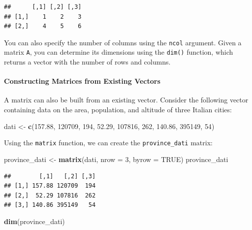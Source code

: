 \documentclass[
]{article}
\newenvironment{Shaded}{\begin{snugshade}}{\end{snugshade}}
\newcommand{\AttributeTok}[1]{\textcolor[rgb]{0.13,0.29,0.53}{#1}}
\newcommand{\ConstantTok}[1]{\textcolor[rgb]{0.56,0.35,0.01}{#1}}
\newcommand{\DecValTok}[1]{\textcolor[rgb]{0.00,0.00,0.81}{#1}}
\newcommand{\FloatTok}[1]{\textcolor[rgb]{0.00,0.00,0.81}{#1}}
\newcommand{\FunctionTok}[1]{\textcolor[rgb]{0.13,0.29,0.53}{\textbf{#1}}}
\newcommand{\NormalTok}[1]{#1}
\newcommand{\OtherTok}[1]{\textcolor[rgb]{0.56,0.35,0.01}{#1}}
\begin{document}
\begin{verbatim}
##      [,1] [,2] [,3]
## [1,]    1    2    3
## [2,]    4    5    6
\end{verbatim}

You can also specify the number of columns using the \texttt{ncol}
argument. Given a matrix \texttt{A}, you can determine its dimensions
using the \texttt{dim()} function, which returns a vector with the
number of rows and columns.

\hypertarget{constructing-matrices-from-existing-vectors}{%
\paragraph{Constructing Matrices from Existing
Vectors}\label{constructing-matrices-from-existing-vectors}}

A matrix can also be built from an existing vector. Consider the
following vector containing data on the area, population, and altitude
of three Italian cities:

\begin{Shaded}
\begin{Highlighting}[]
\NormalTok{dati }\OtherTok{\textless{}{-}} \FunctionTok{c}\NormalTok{(}\FloatTok{157.88}\NormalTok{, }\DecValTok{120709}\NormalTok{, }\DecValTok{194}\NormalTok{, }\FloatTok{52.29}\NormalTok{, }\DecValTok{107816}\NormalTok{, }\DecValTok{262}\NormalTok{, }\FloatTok{140.86}\NormalTok{, }\DecValTok{395149}\NormalTok{, }\DecValTok{54}\NormalTok{)}
\end{Highlighting}
\end{Shaded}

Using the \texttt{matrix} function, we can create the
\texttt{province\_dati} matrix:

\begin{Shaded}
\begin{Highlighting}[]
\NormalTok{province\_dati }\OtherTok{\textless{}{-}} \FunctionTok{matrix}\NormalTok{(dati, }\AttributeTok{nrow =} \DecValTok{3}\NormalTok{, }\AttributeTok{byrow =} \ConstantTok{TRUE}\NormalTok{)}
\NormalTok{province\_dati}
\end{Highlighting}
\end{Shaded}

\begin{verbatim}
##        [,1]   [,2] [,3]
## [1,] 157.88 120709  194
## [2,]  52.29 107816  262
## [3,] 140.86 395149   54
\end{verbatim}

\begin{Shaded}
\begin{Highlighting}[]
\FunctionTok{dim}\NormalTok{(province\_dati)}
\end{Highlighting}
\end{Shaded}
\end{document}
